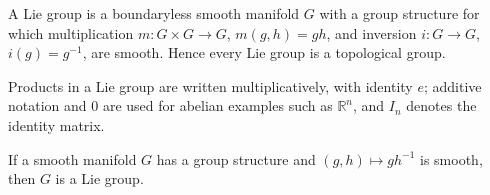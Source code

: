 
\begin{definition}
\label{def:7-46-extra-1}
\mathlibok
A Lie group is a boundaryless smooth manifold $G$ with a group structure for which multiplication $m:G\times G\to G$, $m(g,h)=gh$, and inversion $i:G\to G$, $i(g)=g^{-1}$, are smooth. Hence every Lie group is a topological group.
\end{definition}

\begin{notation}
\label{not:7-46-extra-2}
\mathlibok
Products in a Lie group are written multiplicatively, with identity $e$;
additive notation and $0$ are used for abelian examples such as $\mathbb R^n$,
and $I_n$ denotes the identity matrix.
\end{notation}

\begin{proposition}
\label{prop:7-1}
\leanok
{}
If a smooth manifold $G$ has a group structure and $(g,h)\mapsto gh^{-1}$ is smooth, then $G$ is a Lie group.
\end{proposition}



